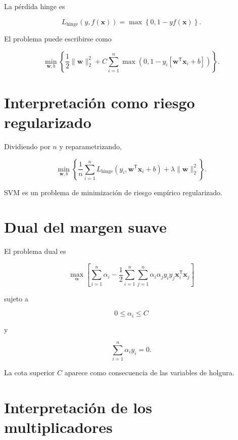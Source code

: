 \documentclass[
  spanish,
  10.5pt,
  letterpaper,
  DIV=11,
  numbers=noendperiod,
  oneside,
  open=any]{scrreprt}
\theoremstyle{definition}
\theoremstyle{definition}
\theoremstyle{plain}
\theoremstyle{remark}
\begin{document}

La pérdida hinge es

\[
L_{\text{hinge}}
(y,f(\mathbf{x}))
=
\max
\left\{
0,
1-yf(\mathbf{x})
\right\}.
\]

El problema puede escribirse como

\[
\min_{\mathbf{w},b}
\left\{
\frac{1}{2}
\|\mathbf{w}\|_2^2
+
C
\sum_{i=1}^{n}
\max
\left(
0,
1-y_i
\left[
\mathbf{w}^{\mathsf T}\mathbf{x}_i+b
\right]
\right)
\right\}.
\]

\section*{Interpretación como riesgo
regularizado}\label{interpretaciuxf3n-como-riesgo-regularizado}


Dividiendo por \(n\) y reparametrizando,

\[
\min_{\mathbf{w},b}
\left\{
\frac{1}{n}
\sum_{i=1}^{n}
L_{\text{hinge}}
\left(
y_i,
\mathbf{w}^{\mathsf T}\mathbf{x}_i+b
\right)
+
\lambda
\|\mathbf{w}\|_2^2
\right\}.
\]

SVM es un problema de minimización de riesgo empírico regularizado.

\section*{Dual del margen suave}\label{dual-del-margen-suave}


El problema dual es

\[
\max_{\boldsymbol{\alpha}}
\left[
\sum_{i=1}^{n}\alpha_i
-
\frac{1}{2}
\sum_{i=1}^{n}
\sum_{j=1}^{n}
\alpha_i\alpha_j
y_i y_j
\mathbf{x}_i^{\mathsf T}\mathbf{x}_j
\right]
\]

sujeto a

\[
0\leq\alpha_i\leq C
\]

y

\[
\sum_{i=1}^{n}\alpha_i y_i=0.
\]

La cota superior \(C\) aparece como consecuencia de las variables de
holgura.

\section*{Interpretación de los
multiplicadores}\label{interpretaciuxf3n-de-los-multiplicadores}
\end{document}
